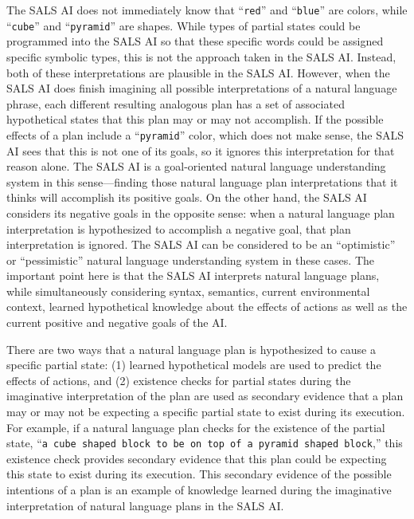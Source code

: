 The SALS AI does not immediately know that ``{\tt{red}}'' and
``{\tt{blue}}'' are colors, while ``{\tt{cube}}'' and
``{\tt{pyramid}}'' are shapes.  While types of partial states could be
programmed into the SALS AI so that these specific words could be
assigned specific symbolic types, this is not the approach taken in
the SALS AI.  Instead, both of these interpretations are plausible in
the SALS AI.  However, when the SALS AI does finish imagining all
possible interpretations of a natural language phrase, each different
resulting analogous plan has a set of associated hypothetical states
that this plan may or may not accomplish.  If the possible effects of
a plan include a ``{\tt{pyramid}}'' color, which does not make sense,
the SALS AI sees that this is not one of its goals, so it ignores this
interpretation for that reason alone.  The SALS AI is a goal-oriented
natural language understanding system in this sense---finding those
natural language plan interpretations that it thinks will accomplish
its positive goals.  On the other hand, the SALS AI considers its
negative goals in the opposite sense: when a natural language plan
interpretation is hypothesized to accomplish a negative goal, that
plan interpretation is ignored.  The SALS AI can be considered to be
an ``optimistic'' or ``pessimistic'' natural language understanding
system in these cases.  The important point here is that the SALS AI
interprets natural language plans, while simultaneously considering
syntax, semantics, current environmental context, learned hypothetical
knowledge about the effects of actions as well as the current positive
and negative goals of the AI.

There are two ways that a natural language plan is hypothesized to
cause a specific partial state: (1) learned hypothetical models are
used to predict the effects of actions, and (2) existence checks for
partial states during the imaginative interpretation of the plan are
used as secondary evidence that a plan may or may not be expecting a
specific partial state to exist during its execution.  For example, if
a natural language plan checks for the existence of the partial state,
``{\tt{a cube shaped block to be on top of a pyramid shaped block}},''
this existence check provides secondary evidence that this plan could
be expecting this state to exist during its execution.  This secondary
evidence of the possible intentions of a plan is an example of
knowledge learned during the imaginative interpretation of natural
language plans in the SALS AI.

